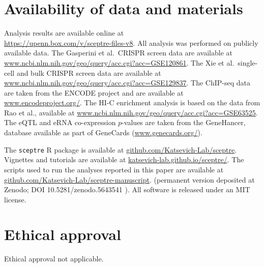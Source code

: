 \documentclass{article}
\begin{document}
\section*{Availability of data and materials} Analysis results are available online at \\
\url{https://upenn.box.com/v/sceptre-files-v8}. All analysis was performed on publicly available data. The Gasperini et al.\ CRISPR screen data\cite{Gasperini2019} are available at \url{www.ncbi.nlm.nih.gov/geo/query/acc.cgi?acc=GSE120861}. The Xie et al.\ single-cell and bulk CRISPR screen data are available at \url{www.ncbi.nlm.nih.gov/geo/query/acc.cgi?acc=GSE129837}. The ChIP-seq data are taken from the ENCODE project\cite{Dunham2012} and are available at \url{www.encodeproject.org/}. The HI-C enrichment analysis is based on the data from Rao et al.\cite{Rao2014}, available at \url{www.ncbi.nlm.nih.gov/geo/query/acc.cgi?acc=GSE63525}. The eQTL and eRNA co-expression $p$-values are taken from the GeneHancer, database\cite{Fishilevich2017} available as part of GeneCards (\url{www.genecards.org/}).

The \texttt{sceptre} R package is available at \url{github.com/Katsevich-Lab/sceptre}. Vignettes and tutorials are available at \url{katsevich-lab.github.io/sceptre/}. The scripts used to run the analyses reported in this paper are available at \\ \url{github.com/Katsevich-Lab/sceptre-manuscript}. (permanent version deposited at Zenodo; DOI 10.5281/zenodo.5643541 \cite{barrycode}). All software is released under an MIT license.
\section*{Ethical approval}
Ethical approval not applicable.

\clearpage
\appendix
\clearpage
\end{document}
